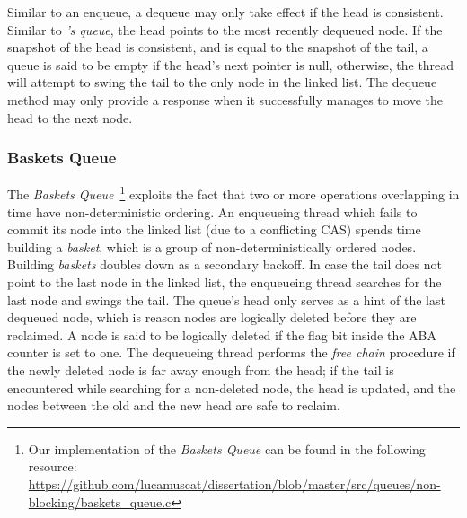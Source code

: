 Similar to an enqueue, a dequeue may only take effect if the head is
consistent. Similar to \emph{\citeauthor{valois1994queues}'s queue}, the head points to
the most recently dequeued node. If the snapshot of the head is consistent, and
is equal to the snapshot of the tail, a queue is said to be empty if the head's
next pointer is null, otherwise, the thread will attempt to swing the tail to
the only node in the linked list. The dequeue method may only provide a
response when it successfully manages to move the head to the next node.

\subsubsection{Baskets Queue}
The \emph{Baskets Queue}~\citep{hoffman2007baskets}\footnote{Our implementation
of the \emph{Baskets Queue} can be found in the following resource:
\url{https://github.com/lucamuscat/dissertation/blob/master/src/queues/non-blocking/baskets_queue.c}}
exploits the fact that two or more operations overlapping in time have
non-deterministic ordering. An enqueueing thread which fails to commit its node
into the linked list (due to a conflicting CAS) spends time building a
\emph{basket}, which is a group of non-deterministically ordered nodes.
Building \emph{baskets} doubles down as a secondary backoff. In case the tail
does not point to the last node in the linked list, the enqueueing thread
searches for the last node and swings the tail. The queue's head only serves as
a hint of the last dequeued node, which is reason nodes are logically deleted
before they are reclaimed. A node is said to be logically deleted if the flag
bit inside the ABA counter is set to one. The dequeueing thread performs the
\emph{free chain} procedure if the newly deleted node is far away enough from
the head; if the tail is encountered while searching for a non-deleted node,
the head is updated, and the nodes between the old and the new head are safe to
reclaim.


